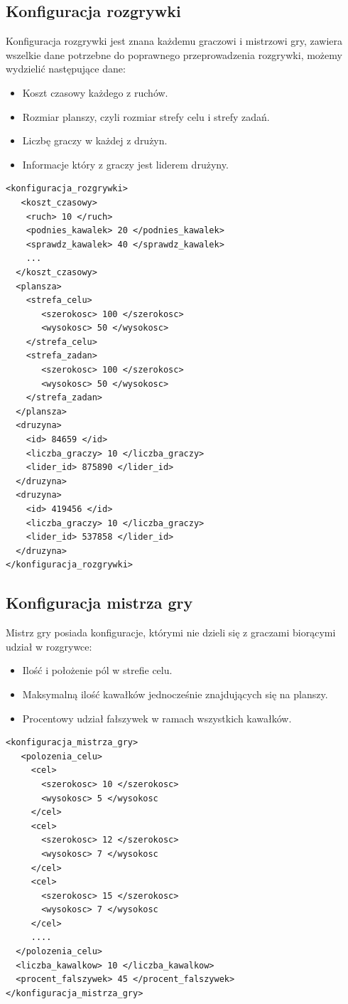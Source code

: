 \documentclass[a4paper]{article}
\begin{document}
\subsection{Konfiguracja rozgrywki}
Konfiguracja rozgrywki jest znana każdemu graczowi i mistrzowi gry, zawiera wszelkie dane potrzebne do poprawnego przeprowadzenia rozgrywki, możemy wydzielić następujące dane:
  \begin{itemize}
  \item
    Koszt czasowy każdego z ruchów.
  \item
    Rozmiar planszy, czyli rozmiar strefy celu i strefy zadań.
  \item 
    Liczbę graczy w każdej z drużyn.
  \item 
    Informacje który z graczy jest liderem drużyny.
  \end{itemize}
  
\begin{lstlisting}
<konfiguracja_rozgrywki>
   <koszt_czasowy>
   	<ruch> 10 </ruch>
  	<podnies_kawalek> 20 </podnies_kawalek> 
  	<sprawdz_kawalek> 40 </sprawdz_kawalek>
	...
  </koszt_czasowy>
  <plansza>
    <strefa_celu>
       <szerokosc> 100 </szerokosc> 
       <wysokosc> 50 </wysokosc>
    </strefa_celu> 
    <strefa_zadan>
       <szerokosc> 100 </szerokosc> 
       <wysokosc> 50 </wysokosc>
    </strefa_zadan> 
  </plansza>
  <druzyna>
    <id> 84659 </id>
    <liczba_graczy> 10 </liczba_graczy>
    <lider_id> 875890 </lider_id>
  </druzyna>
  <druzyna>
    <id> 419456 </id>
    <liczba_graczy> 10 </liczba_graczy>
    <lider_id> 537858 </lider_id>
  </druzyna>
</konfiguracja_rozgrywki>
\end{lstlisting}

\subsection{Konfiguracja mistrza gry}
Mistrz gry posiada konfiguracje, którymi nie dzieli się z graczami biorącymi udział w rozgrywce:
  \begin{itemize}
  \item
    Ilość i położenie pól w strefie celu.
  \item
    Maksymalną ilość kawałków jednocześnie znajdujących się na planszy.
  \item 
    Procentowy udział fałszywek w ramach wszystkich kawałków.
  \end{itemize}
  
\begin{lstlisting}
<konfiguracja_mistrza_gry>
   <polozenia_celu>
     <cel>
       <szerokosc> 10 </szerokosc> 
       <wysokosc> 5 </wysokosc
     </cel>
     <cel>
       <szerokosc> 12 </szerokosc> 
       <wysokosc> 7 </wysokosc
     </cel>
     <cel>
       <szerokosc> 15 </szerokosc> 
       <wysokosc> 7 </wysokosc
     </cel>
     ....
  </polozenia_celu>
  <liczba_kawalkow> 10 </liczba_kawalkow>
  <procent_falszywek> 45 </procent_falszywek>
</konfiguracja_mistrza_gry>
\end{lstlisting}
  
\end{document}
